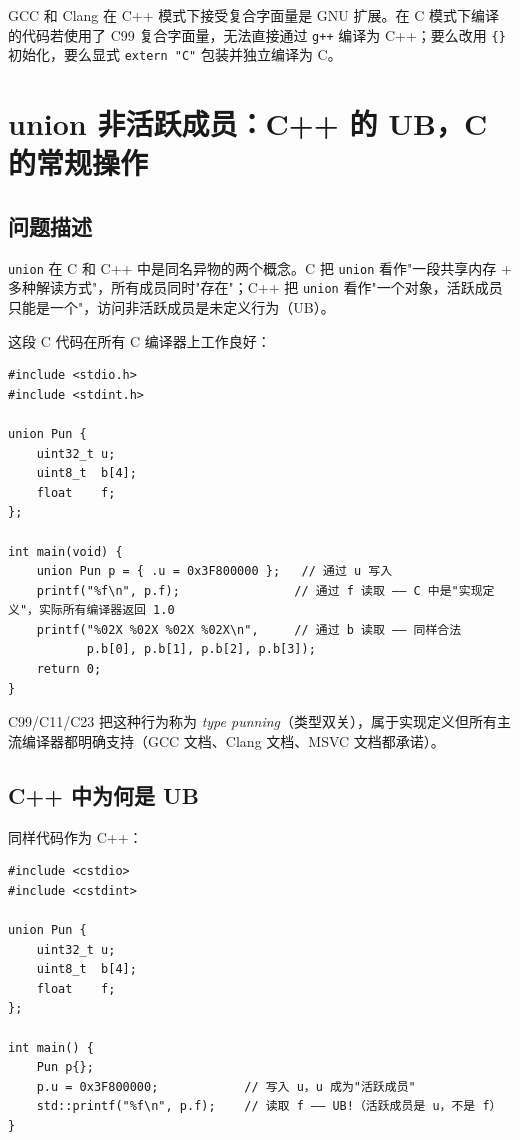 \documentclass[12pt,a4paper,fontset=fandol]{ctexbook}
\newcommand{\cpplabel}{%
  \tcbox[on line,colback=cppheadbg,colframe=cppheadbg,
    boxrule=0pt,arc=1pt,left=2pt,right=2pt,top=1pt,bottom=1pt,
    colupper=white,fontupper=\scriptsize\bfseries]{C++}}
\newcommand{\clabel}{%
  \tcbox[on line,colback=cheadbg,colframe=cheadbg,
    boxrule=0pt,arc=1pt,left=2pt,right=2pt,top=1pt,bottom=1pt,
    colupper=white,fontupper=\scriptsize\bfseries]{C}}
\newcommand{\cpp}[1]{C++#1}
\newcommand{\kw}[1]{\texttt{#1}}
\begin{document}
\begin{warning}
GCC 和 Clang 在 \cpp{} 模式下接受复合字面量是 GNU 扩展。在 C 模式下编译的代码若使用了 C99 复合字面量，无法直接通过 \kw{g++} 编译为 \cpp{}；要么改用 \kw{\{\}} 初始化，要么显式 \kw{extern "C"} 包装并独立编译为 C。
\end{warning}


\chapter{union 非活跃成员：C++ 的 UB，C 的常规操作}

\section{问题描述}

\kw{union} 在 C 和 \cpp{} 中是同名异物的两个概念。C 把 \kw{union} 看作"一段共享内存 + 多种解读方式"，所有成员同时"存在"；\cpp{} 把 \kw{union} 看作"一个对象，活跃成员只能是一个"，访问非活跃成员是未定义行为（UB）。

\clabel{} 这段 C 代码在所有 C 编译器上工作良好：
\begin{lstlisting}[style=cstyle]
#include <stdio.h>
#include <stdint.h>

union Pun {
    uint32_t u;
    uint8_t  b[4];
    float    f;
};

int main(void) {
    union Pun p = { .u = 0x3F800000 };   // 通过 u 写入
    printf("%f\n", p.f);                // 通过 f 读取 —— C 中是"实现定义"，实际所有编译器返回 1.0
    printf("%02X %02X %02X %02X\n",     // 通过 b 读取 —— 同样合法
           p.b[0], p.b[1], p.b[2], p.b[3]);
    return 0;
}
\end{lstlisting}

C99/C11/C23 把这种行为称为 \textit{type punning}（类型双关），属于实现定义但所有主流编译器都明确支持（GCC 文档、Clang 文档、MSVC 文档都承诺）。

\section{C++ 中为何是 UB}

\cpplabel{} 同样代码作为 \cpp{}：
\begin{lstlisting}
#include <cstdio>
#include <cstdint>

union Pun {
    uint32_t u;
    uint8_t  b[4];
    float    f;
};

int main() {
    Pun p{};
    p.u = 0x3F800000;            // 写入 u，u 成为"活跃成员"
    std::printf("%f\n", p.f);    // 读取 f —— UB!（活跃成员是 u，不是 f）
}
\end{lstlisting}
\end{document}
